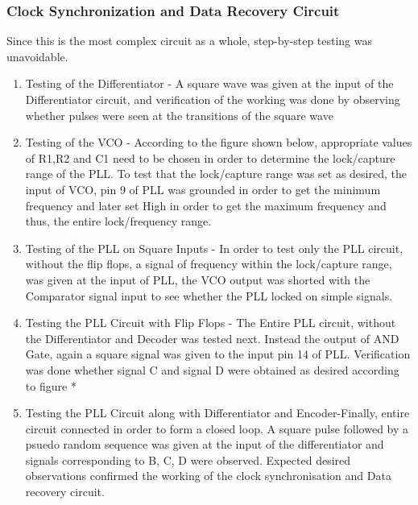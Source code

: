 \documentclass{article}
\begin{document}
\subsubsection{Clock Synchronization and Data Recovery Circuit}
Since this is the most complex circuit as a whole, step-by-step testing was unavoidable.
\begin{enumerate}[label=(\alph*)]
\item Testing of the Differentiator - A square wave was given at the input of the Differentiator circuit, and verification of the working was done by observing whether pulses were seen at the transitions of the square wave 
\item Testing of the VCO - According to the figure shown below, appropriate values of R1,R2 and C1 need to be chosen in order to determine the lock/capture range of the PLL. To test that the lock/capture range was set as desired, the input of VCO, pin 9 of PLL was grounded in order to get the minimum frequency and later set High in order to get the maximum frequency and thus, the entire lock/frequency range.
\item Testing of the PLL on Square Inputs - In order to test only the PLL circuit, without the flip flops, a signal of frequency within the lock/capture range, was given at the input of PLL, the VCO output was shorted with the Comparator signal input to see whether the PLL locked on simple signals.
\item Testing the PLL Circuit with Flip Flops - The Entire PLL circuit, without the Differentiator and Decoder was tested next. Instead the output of AND Gate, again a square signal was given to the input pin 14 of PLL. Verification was done whether signal C and signal D were obtained as desired according to figure *
\item Testing the PLL Circuit along with Differentiator and  Encoder-Finally, entire circuit connected in order to form a closed loop. A square pulse followed by a psuedo random sequence was given at the input of the differentiator and signals corresponding to B, C, D were observed. Expected desired observations confirmed the working of the clock synchronisation and Data recovery circuit.
\end{enumerate}
\end{document}
